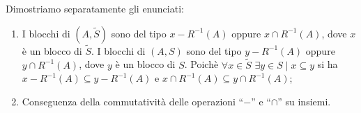 \begin{proof2}
    Dimostriamo separatamente gli enunciati:
    \begin{enumerate}
        \item I blocchi di \splitfunc$(A,\widetilde{S})$ sono del tipo $x - R^{-1}(A)$ oppure $x \cap R^{-1}(A)$, dove $x$ è un blocco di $\widetilde{S}$. I blocchi di \splitfunc$(A,S)$ sono del tipo $y - R^{-1}(A)$ oppure $y \cap R^{-1}(A)$, dove $y$ è un blocco di $S$. Poichè $\forall x \in \widetilde{S} \,\,\exists y \in S \mid x \subseteq y$ si ha $x - R^{-1}(A) \subseteq y - R^{-1}(A)$ e $x \cap R^{-1}(A) \subseteq y \cap R^{-1}(A)$;
        \item Conseguenza della commutatività delle operazioni ``$-$'' e ``$\cap$'' su insiemi.
    \end{enumerate}
    \vspace*{-0.75cm}
\end{proof2}
